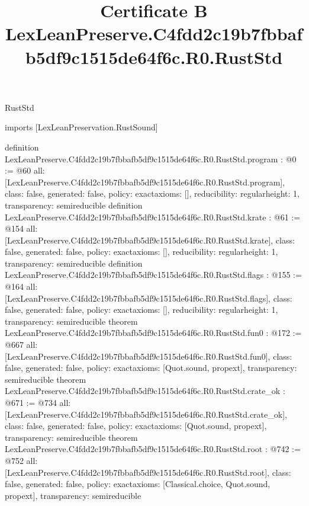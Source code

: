 \begin{lexlean}{RustStd}
\title{Certificate B LexLeanPreserve.C4fdd2c19b7fbbafb5df9c1515de64f6c.R0.RustStd}
\begin{coremodule}
imports [LexLeanPreservation.RustSound]

definition LexLeanPreserve.C4fdd2c19b7fbbafb5df9c1515de64f6c.R0.RustStd.program : @0 := @60 {
  all: [LexLeanPreserve.C4fdd2c19b7fbbafb5df9c1515de64f6c.R0.RustStd.program],
  class: false,
  generated: false,
  policy: exact{axioms: []},
  reducibility: regular{height: 1},
  transparency: semireducible
}
definition LexLeanPreserve.C4fdd2c19b7fbbafb5df9c1515de64f6c.R0.RustStd.krate : @61 := @154 {
  all: [LexLeanPreserve.C4fdd2c19b7fbbafb5df9c1515de64f6c.R0.RustStd.krate],
  class: false,
  generated: false,
  policy: exact{axioms: []},
  reducibility: regular{height: 1},
  transparency: semireducible
}
definition LexLeanPreserve.C4fdd2c19b7fbbafb5df9c1515de64f6c.R0.RustStd.flags : @155 := @164 {
  all: [LexLeanPreserve.C4fdd2c19b7fbbafb5df9c1515de64f6c.R0.RustStd.flags],
  class: false,
  generated: false,
  policy: exact{axioms: []},
  reducibility: regular{height: 1},
  transparency: semireducible
}
theorem LexLeanPreserve.C4fdd2c19b7fbbafb5df9c1515de64f6c.R0.RustStd.fun0 : @172 := @667 {
  all: [LexLeanPreserve.C4fdd2c19b7fbbafb5df9c1515de64f6c.R0.RustStd.fun0],
  class: false,
  generated: false,
  policy: exact{axioms: [Quot.sound, propext]},
  transparency: semireducible
}
theorem LexLeanPreserve.C4fdd2c19b7fbbafb5df9c1515de64f6c.R0.RustStd.crate_ok : @671 := @734 {
  all: [LexLeanPreserve.C4fdd2c19b7fbbafb5df9c1515de64f6c.R0.RustStd.crate_ok],
  class: false,
  generated: false,
  policy: exact{axioms: [Quot.sound, propext]},
  transparency: semireducible
}
theorem LexLeanPreserve.C4fdd2c19b7fbbafb5df9c1515de64f6c.R0.RustStd.root : @742 := @752 {
  all: [LexLeanPreserve.C4fdd2c19b7fbbafb5df9c1515de64f6c.R0.RustStd.root],
  class: false,
  generated: false,
  policy: exact{axioms: [Classical.choice, Quot.sound, propext]},
  transparency: semireducible
}


\end{coremodule}
\end{lexlean}
